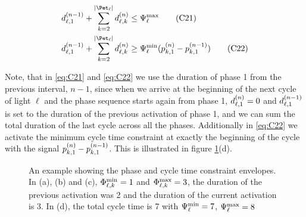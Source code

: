 \begin{align}
\pd[n-1]{\ell}{1} + \sum\limits_{k=2}^{\Pn} \pd{\ell}{k} &\le \CTMAX{\ell} \tag{C21}\label{eq:C21}\\
\pd[n-1]{\ell}{1} + \sum\limits_{k=2}^{\Pn} \pd{\ell}{k} &\ge \CTMIN{\ell} (\p{k}{1} - \p[n-1]{k}{1})\tag{C22}\label{eq:C22}
\end{align}

Note, that in \ref{eq:C21} and \ref{eq:C22} we use the duration of phase 1 from
the previous interval, $n-1$,  since when we arrive at the beginning of the next
cycle of light $\ell$ and the phase sequence starts again from phase 1,
$\pd{\ell}{1}=0$ and $\pd[n-1]{\ell}{1}$ is set to the duration of the previous
activation of phase 1, and we can sum the total duration of the last cycle
across all the phases. Additionally in \ref{eq:C22} we activate the minimum
cycle time constraint at exactly the beginning of the cycle with the signal
$\p{k}{1} - \p[n-1]{k}{1}$. This is illustrated in figure
\ref{fig:phase_plots}(d).

\begin{figure*}[t!]
\centering
\caption{An example showing the phase and cycle time constraint envelopes. In
(a), (b) and (c), $\PTMIN{\ell}{k}=1$ and $\PTMAX{\ell}{k}=3$, the duration of
the previous activation was 2 and the duration of the current activation is 3.
In (d), the total cycle time is 7 with $\CTMIN{\ell}=7$, $\CTMAX{\ell}=8$}
\label{fig:phase_plots}
\end{figure*}

